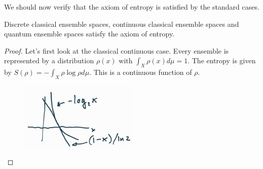 We should now verify that the axiom of entropy is satisfied by the standard cases.

\begin{mathSection}
	\begin{prop}
		Discrete classical ensemble spaces, continuous classical ensemble spaces and quantum ensemble spaces satisfy the axiom of entropy.
	\end{prop}
	
	\begin{proof}
		Let's first look at the classical continuous case. Every ensemble is represented by a distribution $\rho(x)$ with $\int_X \rho(x) d\mu=1$. The entropy is given by $S(\rho) = - \int_X \rho \log \rho d\mu$. This is a continuous function of $\rho$.
		
		\begin{figure}[H]
			\centering
			\includegraphics[width=0.5\textwidth]{tempimages/LogBound.jpg}
		\end{figure}
		

\end{proof}
\end{mathSection}
